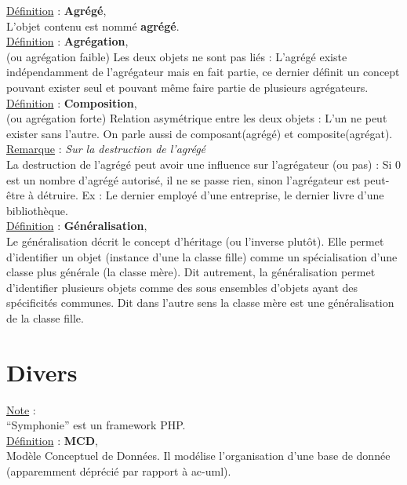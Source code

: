 \documentclass[a4paper,12pt,twoside]{article}
\newcommand{\rem}[2]{\noindent\underline{Remarque} : \textit{#1}\\ \indent #2}
\newcommand{\note}[1]{\noindent\underline{Note} : \\ \indent #1}
\newcommand{\defi}[2]{\noindent\underline{Définition} : \textbf{#1},\\ \indent #2}
\begin{document}
\defi{Agrégé}{L'objet contenu est nommé \textbf{agrégé}.} \\

\defi{Agrégation}{ (ou agrégation faible) Les deux objets ne sont pas liés : L’agrégé existe
indépendamment de l’agrégateur mais en fait partie, ce dernier
définit un concept pouvant exister seul et pouvant même faire
partie de plusieurs agrégateurs.} \\

\defi{Composition}{ (ou agrégation forte) Relation asymétrique entre les deux objets : L’un ne peut exister sans l’autre. On parle aussi de composant(agrégé) et composite(agrégat).} \\

\rem{Sur la destruction de l'agrégé}{La destruction de l’agrégé peut avoir une influence sur
l’agrégateur (ou pas) : Si 0 est un nombre d’agrégé autorisé, il
ne se passe rien, sinon l’agrégateur est peut-être à détruire.
Ex : Le dernier employé d’une entreprise, le dernier livre d’une
bibliothèque.} \\

\defi{Généralisation}{Le généralisation décrit le concept d'héritage (ou l'inverse plutôt). Elle permet d'identifier un objet (instance d'une la classe fille) comme un spécialisation d'une classe plus générale (la classe mère). Dit autrement, la généralisation permet d'identifier plusieurs objets comme des sous ensembles d'objets ayant des spécificités communes. Dit dans l'autre sens la classe mère est une généralisation de la classe fille.}

\section{Divers}

\note{``Symphonie'' est un framework PHP.} \\

\defi{MCD}{Modèle Conceptuel de Données. Il modélise l'organisation d'une base de donnée (apparemment déprécié par rapport à \gls{ac-uml}).}


\newpage
\printglossary[type=\acronymtype]%
\glsaddallunused %
\printglossary[type = main,nonumberlist]%
\end{document}
